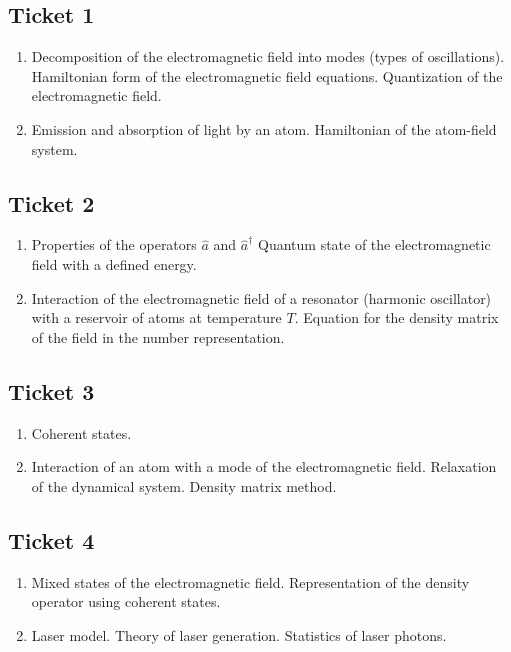 


\Russian


\subsection*{Ticket 1} 
\begin{enumerate}
\item Decomposition of the electromagnetic field into modes (types of oscillations).
Hamiltonian form of the electromagnetic field equations.
Quantization of the electromagnetic field. 
\item Emission and absorption of light by an atom.
Hamiltonian of the atom-field system.
\end{enumerate}

\subsection*{Ticket 2} 
\begin{enumerate}
\item Properties of the operators $ \hat a $ and $ \hat a ^\dag $ 
Quantum state of the electromagnetic field with a defined
  energy. 
\item Interaction of the electromagnetic field of a resonator
(harmonic oscillator) with a reservoir of atoms at
temperature $T$.
Equation for the density matrix of the field in the number
representation.
\end{enumerate}

\subsection*{Ticket 3} 
\begin{enumerate}
\item Coherent states. 
\item Interaction of an atom with a mode of the electromagnetic field.
Relaxation of the dynamical system. Density matrix method.
\end{enumerate}

\subsection*{Ticket 4} 
\begin{enumerate}
\item Mixed states of the electromagnetic field.
Representation of the density operator using coherent
states. 
\item Laser model. Theory of laser generation. Statistics of laser
photons. 
\end{enumerate}

